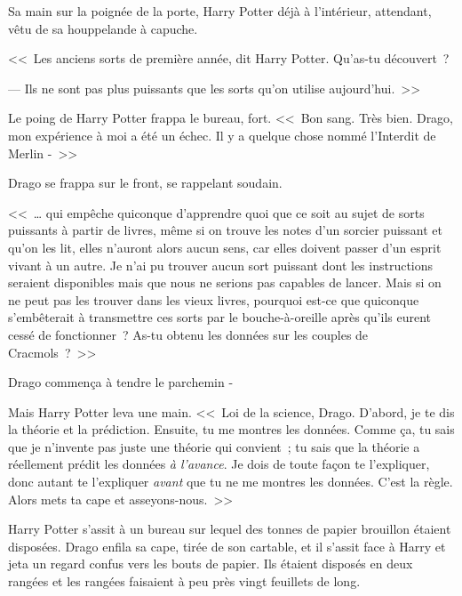 Sa main sur la poignée de la porte, Harry Potter déjà à l'intérieur, attendant, vêtu de sa houppelande à capuche.

<<~Les anciens sorts de première année, dit Harry Potter. Qu'as-tu découvert~?

--- Ils ne sont pas plus puissants que les sorts qu'on utilise aujourd'hui.~>>

Le poing de Harry Potter frappa le bureau, fort. <<~Bon sang. Très bien. Drago, mon expérience à moi a été un échec. Il y a quelque chose nommé l'Interdit de Merlin -~>>

Drago se frappa sur le front, se rappelant soudain.

<<~… qui empêche quiconque d'apprendre quoi que ce soit au sujet de sorts puissants à partir de livres, même si on trouve les notes d'un sorcier puissant et qu'on les lit, elles n'auront alors aucun sens, car elles doivent passer d'un esprit vivant à un autre. Je n'ai pu trouver aucun sort puissant dont les instructions seraient disponibles mais que nous ne serions pas capables de lancer. Mais si on ne peut pas les trouver dans les vieux livres, pourquoi est-ce que quiconque s'embêterait à transmettre ces sorts par le bouche-à-oreille après qu'ils eurent cessé de fonctionner~? As-tu obtenu les données sur les couples de Cracmols~?~>>

Drago commença à tendre le parchemin -

Mais Harry Potter leva une main. <<~Loi de la science, Drago. D'abord, je te dis la théorie et la prédiction. Ensuite, tu me montres les données. Comme ça, tu sais que je n'invente pas juste une théorie qui convient~; tu sais que la théorie a réellement prédit les données \emph{à l'avance}. Je dois de toute façon te l'expliquer, donc autant te l'expliquer \emph{avant} que tu ne me montres les données. C'est la règle. Alors mets ta cape et asseyons-nous.~>>

Harry Potter s'assit à un bureau sur lequel des tonnes de papier brouillon étaient disposées. Drago enfila sa cape, tirée de son cartable, et il s'assit face à Harry et jeta un regard confus vers les bouts de papier. Ils étaient disposés en deux rangées et les rangées faisaient à peu près vingt feuillets de long.

